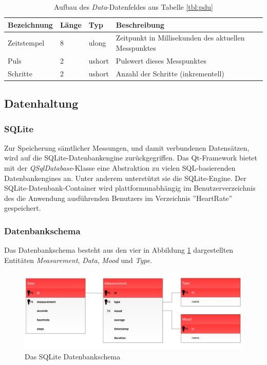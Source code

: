 \begin{table}[h]
	\centering
		\begin{tabularx}{\textwidth}{l|l|l|X}
			\hline
			Bezeichnung & Länge & Typ & Beschreibung \\
			\hline
			\hline
			Zeitstempel & 8 & ulong & Zeitpunkt in Millisekunden des aktuellen Messpunktes\\
			\hline
			Puls & 2 & ushort & Pulswert dieses Messpunktes\\
			\hline
			Schritte & 2 & ushort & Anzahl der Schritte (inkrementell)\\
			\hline
		\end{tabularx}
		\caption{Aufbau des \textit{Data}-Datenfeldes aus Tabelle \ref{tbl:pdu}}
		\label{tbl:datafield-description}
\end{table}

\subsection{Datenhaltung}
\subsubsection{SQLite}
Zur Speicherung sämtlicher Messungen, und damit verbundenen Datensätzen, wird auf die SQLite-Datenbankengine zurückgegriffen. Das Qt-Framework bietet mit der \textit{QSqlDatabase}-Klasse eine Abstraktion zu vielen SQL-basierenden Datenbankengines an\cite{qsqldatabase}. Unter anderem unterstützt sie die SQLite-Engine. Der SQLite-Datenbank-Container wird plattformunabhängig im Benutzerverzeichnis des die Anwendung ausführenden Benutzers im Verzeichnis ''HeartRate'' gespeichert.

\subsubsection{Datenbankschema}
Das Datenbankschema besteht aus den vier in Abbildung \ref{pic:database-scheme} dargestellten Entitäten \textit{Measurement}, \textit{Data}, \textit{Mood} und \textit{Type}. 
\begin{figure}[H]
	\centering
	\includegraphics[scale=0.6]{images/database-schema.pdf}
	\caption{Das SQLite Datenbankschema}
	\label{pic:database-scheme}
\end{figure}

